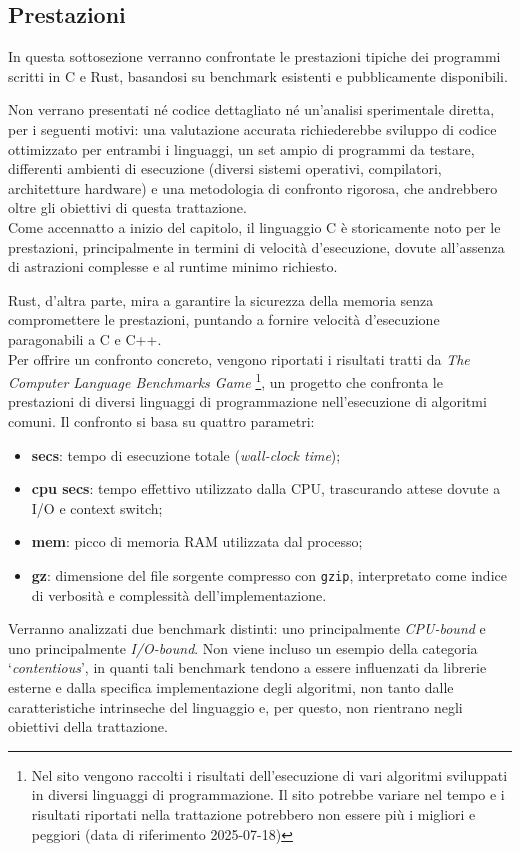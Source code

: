 \subsection{Prestazioni}
In questa sottosezione verranno confrontate le prestazioni tipiche dei programmi scritti in C e Rust, basandosi
su benchmark esistenti e pubblicamente disponibili.

Non verrano presentati né codice dettagliato né un'analisi sperimentale diretta, per i seguenti motivi: una valutazione accurata
richiederebbe sviluppo di codice ottimizzato per entrambi i linguaggi, un set ampio di programmi da testare, differenti ambienti di esecuzione (diversi sistemi operativi, compilatori, architetture hardware) e una metodologia
di confronto rigorosa, che andrebbero oltre gli obiettivi di questa trattazione. \hfill
\vspace{10pt}\\
\noindent Come accennatto a inizio del capitolo, il linguaggio C è storicamente noto per le prestazioni, principalmente in termini di velocità d'esecuzione, dovute all'assenza di astrazioni
complesse e al runtime minimo richiesto. 

Rust, d'altra parte, mira a garantire la sicurezza della memoria senza compromettere le prestazioni, puntando a fornire velocità d'esecuzione paragonabili a C e C++. \hfill
\vspace{10pt}\\
\noindent Per offrire un confronto concreto, vengono riportati i risultati tratti da \textit{The Computer Language Benchmarks Game}\cite{benchmarksgame}
\footnote{Nel sito vengono raccolti i risultati dell'esecuzione di vari algoritmi sviluppati in diversi linguaggi di programmazione. Il sito potrebbe variare nel tempo e
i risultati riportati nella trattazione potrebbero non essere più i migliori e peggiori (data di riferimento 2025-07-18)}, un progetto che
confronta le prestazioni di diversi linguaggi di programmazione nell'esecuzione di algoritmi comuni. Il confronto si basa su quattro parametri:
\begin{itemize}
    \item \textbf{secs}: tempo di esecuzione totale (\textit{wall-clock time});
    \item \textbf{cpu secs}: tempo effettivo utilizzato dalla CPU, trascurando attese dovute a I/O e context switch;
    \item \textbf{mem}: picco di memoria RAM utilizzata dal processo;
    \item \textbf{gz}: dimensione del file sorgente compresso con \texttt{gzip}, interpretato come indice di verbosità e complessità dell'implementazione.
\end{itemize}
Verranno analizzati due benchmark distinti: uno principalmente \textit{CPU-bound} e uno principalmente \textit{I/O-bound}. 
Non viene incluso un esempio della categoria `\textit{contentious}', in quanti tali benchmark tendono a essere influenzati 
da librerie esterne e dalla specifica implementazione degli algoritmi, non tanto dalle caratteristiche intrinseche del linguaggio e, per questo, 
non rientrano negli obiettivi della trattazione.

